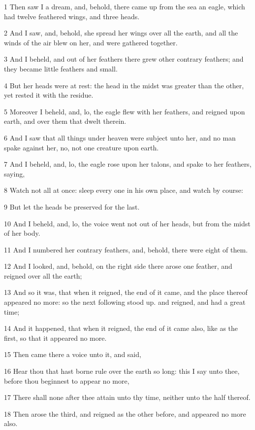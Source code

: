 \par 1 Then saw I a dream, and, behold, there came up from the sea an eagle, which had twelve feathered wings, and three heads.
\par 2 And I saw, and, behold, she spread her wings over all the earth, and all the winds of the air blew on her, and were gathered together.
\par 3 And I beheld, and out of her feathers there grew other contrary feathers; and they became little feathers and small.
\par 4 But her heads were at rest: the head in the midst was greater than the other, yet rested it with the residue.
\par 5 Moreover I beheld, and, lo, the eagle flew with her feathers, and reigned upon earth, and over them that dwelt therein.
\par 6 And I saw that all things under heaven were subject unto her, and no man spake against her, no, not one creature upon earth.
\par 7 And I beheld, and, lo, the eagle rose upon her talons, and spake to her feathers, saying,
\par 8 Watch not all at once: sleep every one in his own place, and watch by course:
\par 9 But let the heads be preserved for the last.
\par 10 And I beheld, and, lo, the voice went not out of her heads, but from the midst of her body.
\par 11 And I numbered her contrary feathers, and, behold, there were eight of them.
\par 12 And I looked, and, behold, on the right side there arose one feather, and reigned over all the earth;
\par 13 And so it was, that when it reigned, the end of it came, and the place thereof appeared no more: so the next following stood up. and reigned, and had a great time;
\par 14 And it happened, that when it reigned, the end of it came also, like as the first, so that it appeared no more.
\par 15 Then came there a voice unto it, and said,
\par 16 Hear thou that hast borne rule over the earth so long: this I say unto thee, before thou beginnest to appear no more,
\par 17 There shall none after thee attain unto thy time, neither unto the half thereof.
\par 18 Then arose the third, and reigned as the other before, and appeared no more also.
